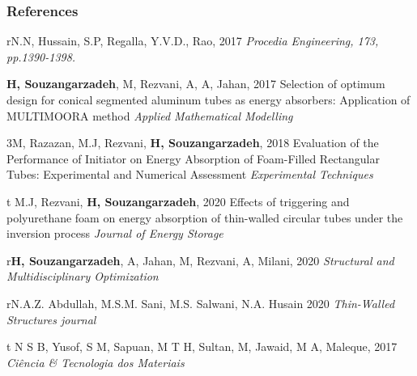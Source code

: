 \documentclass{beamer}
\begin{document}
	
	
	\begin{frame}
		\frametitle{References}
		\tiny{
			\begin{thebibliography}{99} %
				\bibitem rN.N, Hussain, S.P, Regalla,   Y.V.D., Rao,  2017
				\newblock \emph {Procedia Engineering, 173, pp.1390-1398.}
				
				
				
				\textbf{H, Souzangarzadeh}, M,	Rezvani, A,	 A,	Jahan, 2017
				\newblock Selection of optimum design for conical segmented aluminum tubes as energy absorbers: Application of MULTIMOORA method
				\newblock \emph{Applied Mathematical Modelling} 
				
				\bibitem 3M, Razazan, M.J, Rezvani,  \textbf{H, Souzangarzadeh},  2018
				\newblock Evaluation of the Performance of Initiator on Energy Absorption of Foam-Filled Rectangular Tubes: Experimental and Numerical Assessment 
				\newblock \emph{Experimental Techniques} 
				
				\bibitem t M.J, Rezvani,  \textbf{H, Souzangarzadeh},  2020
				\newblock Effects of triggering and polyurethane foam on energy absorption of thin-walled circular tubes under the inversion process 
				\newblock \emph{Journal of Energy Storage} 
				
				\bibitem r\textbf{H, Souzangarzadeh}, A,	Jahan, M,	Rezvani, A,	Milani, 2020
				\newblock \emph {Structural and Multidisciplinary Optimization}
				
	\bibitem rN.A.Z. Abdullah, M.S.M. Sani, M.S. Salwani, N.A. Husain 2020
\newblock \emph{Thin-Walled Structures journal}

\bibitem t
N S B, Yusof,
 S M, Sapuan,
 M T H, Sultan,
 M, Jawaid,
 M A, Maleque,
2017
\newblock \emph{Ci{\^{e}}ncia {\&} Tecnologia dos Materiais}
				
			
			\end{thebibliography}
		}
	\end{frame}
	
\end{document}
